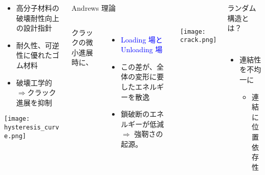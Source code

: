 
\begin{columns}[T]
    \begin{column}{.33\linewidth}
        \begin{itemize}
            \item 高分子材料の破壊耐性向上の設計指針
            \item 耐久性、可逆性に優れたゴム材料
            \item 破壊工学的$\Rightarrow$クラック進展を抑制
        \end{itemize}
        \centering
        \texttt{[image: hysteresis\_curve.png]} 
    \end{column}
    \begin{column}{.33\linewidth}
        \begin{itembox}[l]{Andrews 理論\cite{andrews}}
            \begin{columns}[totalwidth=.9\textwidth]
                    クラックの微小進展時に、
                    \begin{itemize}
                    \item
                    \textcolor{blue}{Loading 場とUnloading 場}
                    \item
                    \alert{この差}が、全体の変形に要したエネルギーを\alert{散逸}
                    \item
                    鎖破断のエネルギーが低減 $\Rightarrow$ \alert{強靭さの起源。}
                    \end{itemize}	
                    \texttt{[image: crack.png]}     
            \end{columns}
        \end{itembox}
    \end{column}
    \begin{column}{.33\linewidth}
        \begin{itembox}[l]{ランダム構造とは？}
            \begin{columns}[totalwidth=.9\textwidth]
                        \begin{itemize}
                            \item 連結性を不均一に
                                \begin{itemize}
                                    \item 連結に\alert{位置依存性}
                                \end{itemize}

\end{itemize}
\end{columns}
\end{itembox}
\end{column}
\end{columns}
